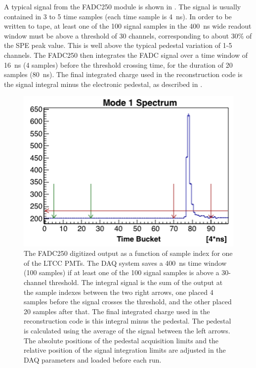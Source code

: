 A typical signal from the FADC250 module is shown in . The signal is usually contained in 3 to 5 time samples
(each time sample is 4~ns). In order to be written to tape, at least one of the 100 signal samples in the 400~ns
wide readout window must be above a threshold of 30 channels, corresponding to about 30\% of the SPE peak value.
This is well above the typical pedestal variation of 1-5 channels. The FADC250 then integrates the FADC signal over
a time window of 16~ns (4 samples) before the threshold crossing time, for the duration of 20 samples (80~ns). The
final integrated charge used in the reconstruction code is the signal integral minus the electronic pedestal, as
described in .

\begin{figure}[H]
	\centering
	\includegraphics[width=0.99\columnwidth, height=0.6\columnwidth]{img/fadc.png}
	\caption{The FADC250 digitized output as a function of sample index for one of the LTCC PMTs.
          The DAQ system saves a 400~ns time window (100 samples) if at least one of the 100 signal samples is
          above a 30-channel threshold. The integral signal is the sum of the output at the sample indexes between
          the two right arrows, one placed 4 samples before the signal crosses the threshold, and the other placed
          20 samples after that. The final integrated charge used in the reconstruction code is this integral minus
          the pedestal. The pedestal is calculated using the average of the signal between the left arrows. The
          absolute positions of the pedestal acquisition limits and the relative position of the signal integration
          limits are adjusted in the DAQ parameters and loaded before each run.}
	\label{fig:fadc}
\end{figure}

